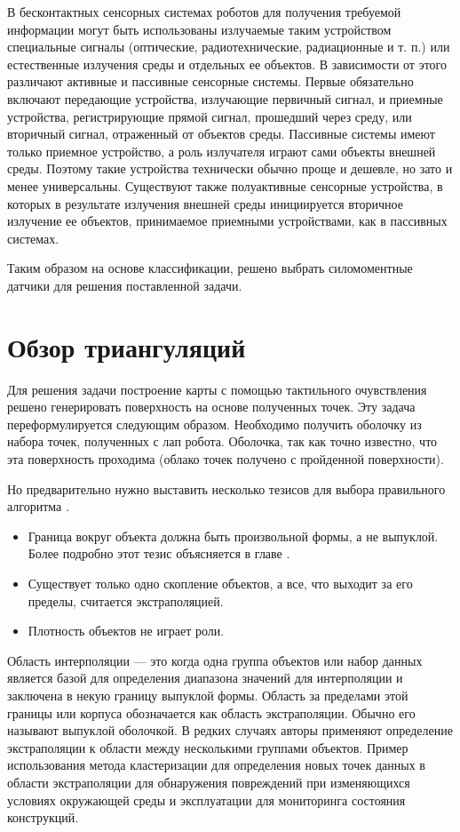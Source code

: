 В бесконтактных сенсорных системах роботов для получения требуемой информации могут быть использованы излучаемые таким устройством специальные сигналы (оптические, радиотехнические, радиационные и т. п.) или естественные излучения среды и отдельных ее объектов. В зависимости от этого различают активные и пассивные сенсорные системы. Первые обязательно включают передающие устройства, излучающие первичный сигнал, и приемные устройства, регистрирующие прямой сигнал, прошедший через среду, или вторичный сигнал, отраженный от объектов среды. Пассивные системы имеют только приемное устройство, а роль излучателя играют сами объекты внешней среды. Поэтому такие устройства технически обычно проще и дешевле, но зато и менее универсальны. Существуют также полуактивные сенсорные устройства, в которых в результате излучения внешней среды инициируется вторичное излучение ее объектов, принимаемое приемными устройствами, как в пассивных системах.
 
Таким образом на основе классификации, решено выбрать силомоментные датчики для решения поставленной задачи.

\section{Обзор триангуляций}
Для решения задачи построение карты с помощью тактильного очувствления решено генерировать поверхность на основе полученных точек. Эту задача переформулируется следующим образом. Необходимо получить оболочку из набора точек, полученных с лап робота. Оболочка, так как точно известно, что эта поверхность проходима (облако точек получено с пройденной поверхности). 

Но предварительно нужно выставить несколько тезисов для выбора правильного алгоритма \cite{ebertInterpolationExtrapolationComparison2014,kumarSurfaceTriangulationSurvey,aurenhammerVoronoiDiagramsSurvey1991}.
\begin{itemize}
    \item Граница вокруг объекта должна быть произвольной формы, а не выпуклой. Более подробно этот тезис объясняется в главе .
    \item Существует только одно скопление объектов, а все, что выходит за его пределы, считается экстраполяцией. 
    \item Плотность объектов не играет роли.
\end{itemize}

Область интерполяции \cite{brooksCharacterizingDomainRegression1988,patelLinearProgramDetect1995,baranyiEffectsParameterizationPerformance1996,haffnerEscapingConvexHull2001,kingDangersExtremeCounterfactuals2006} --- это когда одна группа объектов или набор данных является базой для определения диапазона значений для интерполяции и заключена в некую границу выпуклой формы. Область за пределами этой границы или корпуса обозначается как область экстраполяции. Обычно его называют выпуклой оболочкой. В редких случаях авторы применяют определение экстраполяции к области между несколькими группами объектов. Пример использования метода кластеризации для определения новых точек данных в области экстраполяции для обнаружения повреждений при изменяющихся условиях окружающей среды и эксплуатации для мониторинга состояния конструкций.

